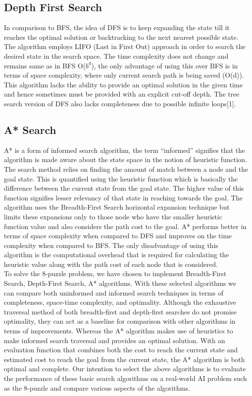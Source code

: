 \documentclass{svproc}
\begin{document}
\subsection{Depth First Search}
\noindent In comparison to BFS, the idea of DFS is to keep expanding the state till it reaches the optimal solution or backtracking to the next nearest possible state. The algorithm employs LIFO (Last in First Out) approach in order to search the desired state in the search space. The time complexity does not change and remains same as in BFS O($b^{d}$), the only advantage of using this over BFS is in terms of space complexity, where only current search path is being saved (O(d)). This algorithm lacks the ability to provide an optimal solution in the given time and hence sometimes must be provided with an explicit cut-off depth.  The tree search version of DFS also lacks completeness due to possible infinite loops[1].

\subsection{A* Search }
\noindent A* is a form of informed search algorithm, the term “informed” signifies that the algorithm is made aware about the state space in the notion of heuristic function. The search method relies on finding the amount of match between a node and the goal state. This is quantified using the heuristic function which is basically the difference between the current state from the goal state. The higher value of this function signifies lesser relevancy of that state in reaching towards the goal. The algorithm uses the Breadth-First Search horizontal expansion technique but limits these expansions only to those node who have the smaller heuristic function value and also considers the path cost to the goal. A* performs better in terms of space complexity when compared to DFS  and  improves on the time complexity  when compared to BFS. The only disadvantage of using this algorithm is the computational overhead that is required for calculating the heuristic value along with the path cost of each node that is considered. \\

\noindent To solve the 8-puzzle problem, we have chosen to implement Breadth-First Search, Depth-First Search, A* algorithms. With these selected algorithms we can compare both uninformed and informed search techniques in terms of completeness, space-time complexity, and optimality. Although the exhaustive traversal method of both breadth-first and depth-first searches do not promise optimality, they can act as a baseline for comparison with other algorithms in terms of improvements. Whereas the A* algorithm makes use of heuristics to make informed search traversal and provides an optimal solution. With an evaluation function that combines both the cost to reach the current state and estimated cost to reach the goal from the current state, the A* algorithm is both optimal and complete. Our intention to select the above algorithms is to evaluate the performance of these basic search algorithms on a real-world AI problem such as the 8-puzzle and compare various aspects of the algorithms.
\end{document}
